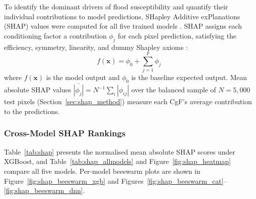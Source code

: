 \documentclass[12pt, a4paper]{article}
\begin{document}
To identify the dominant drivers of flood susceptibility and quantify their individual contributions to model predictions, SHapley Additive exPlanations (SHAP) values were computed for all five trained models \citep{lundberg2017, lundberg2020}.  SHAP assigns each conditioning factor a contribution $\phi_j$ for each pixel prediction, satisfying the efficiency, symmetry, linearity, and dummy Shapley axioms \citep{shapley1953}:
\begin{equation}
  f(\mathbf{x}) = \phi_0 + \sum_{j=1}^{p} \phi_j
  \label{eq:shap}
\end{equation}
where $f(\mathbf{x})$ is the model output and $\phi_0$ is the baseline expected output.  Mean absolute SHAP values $\bar{|\phi_j|} = N^{-1}\sum_i |\phi_{ij}|$ over the balanced sample of $N = 5{,}000$ test pixels (Section~\ref{sec:shap_method}) measure each CgF's average contribution to the predictions.

\subsubsection{Cross-Model SHAP Rankings}

Table~\ref{tab:shap} presents the normalised mean absolute SHAP scores under XGBoost, and Table~\ref{tab:shap_allmodels} and Figure~\ref{fig:shap_heatmap} compare all five models. Per-model beeswarm plots are shown in Figure~\ref{fig:shap_beeswarm_xgb} and Figures~\ref{fig:shap_beeswarm_cat}--\ref{fig:shap_beeswarm_dnn}.
\end{document}
